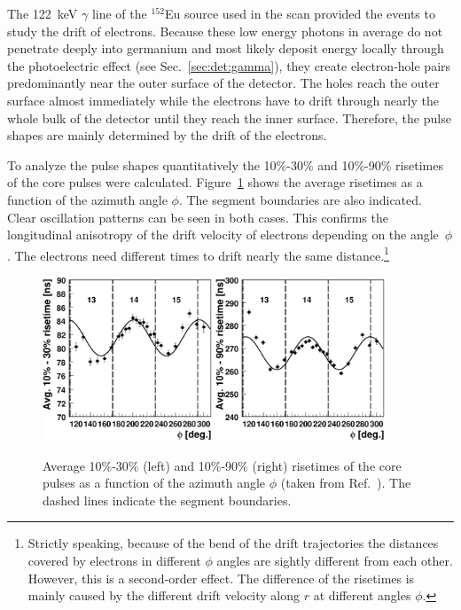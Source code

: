 The 122~keV $\gamma$ line of the $^{152}$Eu source used in the scan
provided the events to study the drift of electrons. Because these low
energy photons in average do not penetrate deeply into germanium and
most likely deposit energy locally through the photoelectric effect
(see Sec.~\ref{sec:det:gamma}), they create electron-hole pairs
predominantly near the outer surface of the detector. The holes reach
the outer surface almost immediately while the electrons have to drift
through nearly the whole bulk of the detector until they reach the
inner surface. Therefore, the pulse shapes are mainly determined by
the drift of the electrons.

To analyze the pulse shapes quantitatively the 10\%-30\% and 10\%-90\%
risetimes of the core pulses were calculated.
Figure~\ref{fig:psa:rt10} shows the average risetimes as a function of
the azimuth angle $\phi$. The segment boundaries are also indicated.
Clear oscillation patterns can be seen in both cases. This confirms
the longitudinal anisotropy of the drift velocity of electrons
depending on the angle~$\phi$. The electrons need different times to
drift nearly the same distance.\footnote{Strictly speaking, because of
the bend of the drift trajectories the distances covered by electrons
in different $\phi$ angles are sightly different from each other.
However, this is a second-order effect. The difference of the
risetimes is mainly caused by the different drift velocity along $r$
at different angles $\phi$.}
\begin{figure}[htbp]
\centering
\includegraphics[width=0.45\textwidth]{phi_risetime1030}
\includegraphics[width=0.45\textwidth]{phi_risetime1090}
\caption{Average 10\%-30\% (left) and 10\%-90\% (right) risetimes of
the core pulses as a function of the azimuth angle $\phi$ (taken from
Ref.~\cite{Sie07}).  The dashed lines indicate the segment
boundaries.}
\label{fig:psa:rt10}
\end{figure}

